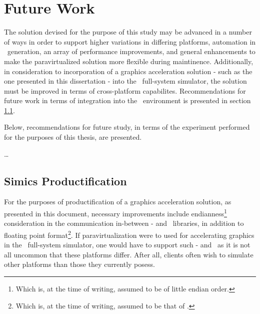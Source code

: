 
\chapter{Future Work}
\label{cha:futurework}
The solution devised for the purpose of this study may be advanced in a number of ways in order to support higher variations in differing platforms, automation in \dvttermabi\ generation, an array of performance improvements, and general enhancements to make the paravirtualized solution more flexible during maintinence.
Additionally, in consideration to incorporation of a graphics acceleration solution - such as the one presented in this dissertation - into the \dvttermsimics\ full-system simulator, the solution must be improved in terms of cross-platform capabilites.
Recommendations for future work in terms of integration into the \dvttermsimics\ environment is presented in section \ref{sec:futurework_simicsproductification}.

Below, recommendations for future study, in terms of the experiment performed for the purposes of this thesis, are presented.\\

\noindent


\ldots

\section{Simics Productification}
\label{sec:futurework_simicsproductification}
For the purposes of productification of a graphics acceleration solution, as presented in this document, necessary improvements include endianness\footnote{Which is, at the time of writing, assumed to be of little endian order.} consideration in the communication in-between \dvttermtarget - and \dvttermhost\ libraries, in addition to floating point format\footnote{Which is, at the time of writing, assumed to be that of \dvttermieeefp .}.
If paravirtualization were to used for accelerating graphics in the \dvttermsimics\ full-system simulator, one would have to support such \dvttermtarget - and \dvttermhost\ as it is not all uncommon that these platforms differ.
After all, clients often wish to simulate other platforms than those they currently posess.

